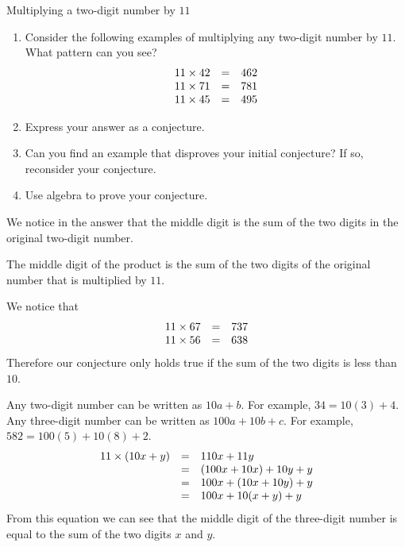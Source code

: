 \begin{wex}{Multiplying a two-digit number by $11$ }{
\begin{enumerate}[noitemsep, label=\textbf{\arabic*}. ] 
\item Consider the following examples of multiplying any two-digit number by $11$. What pattern can you see?
\begin{equation*}
    \begin{array}{ccc}\hfill 11 \times 42 &=& 462\\ 11 \times 71 &=& 781\\ 11 \times 45 &=& 495\end{array}
\end{equation*}

\item Express your answer as a conjecture.
\item Can you find an example that disproves your initial conjecture? If so, reconsider your conjecture.
\item Use algebra to prove your conjecture.
\end{enumerate}
}
{   
We notice in the answer that the middle digit is the sum of the two digits in the original two-digit number.

The middle digit of the product is the sum of the two digits of the original number that is multiplied by $11$.
   
We notice that 
\begin{equation*}
    \begin{array}{ccc}\hfill 11 \times 67 &=& 737\\ 11 \times 56 &=& 638\end{array}
\end{equation*}
Therefore our conjecture only holds true if the sum of the two digits is less than $10$.

Any two-digit number can be written as $10a+b$. For example, $34=
10(3)+4$. Any three-digit number can be written as $100a+10b+c$. For
example, $582=100(5)+ 10(8) +2$.
\begin{equation*}
    \begin{array}{ccl}\hfill 11 \times (10x+y) &=& 110x + 11y\\ &=&(100x + 10x) + 10y + y\\&=& 100x + (10x+ 10y) + y\\&=& 100x + 10(x+y) + y\end{array}
\end{equation*} 
From this equation we can see that the middle digit of the three-digit
number is equal to the sum of the two digits $x$ and $y$.
}
\end{wex}



